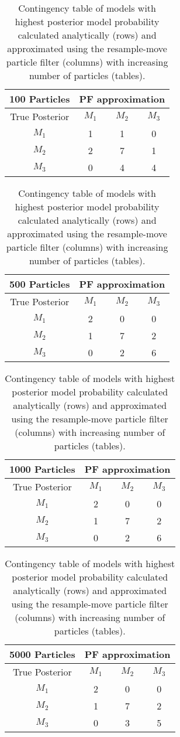 \documentclass{article}
\begin{document}
\begin{table}[h]
\centering
\caption{Contingency table of models with highest posterior model probability calculated analytically (rows) and approximated using the resample-move particle filter (columns) with increasing number of particles (tables).} \label{tab:cont}
\begin{tabular}{|c|c|c|c|}
  \hline
{\bf 100 Particles} & \multicolumn{3}{|c|}{PF approximation} \\
 \hline
 True Posterior & $M_1$& $M_2$ & $M_3$ \\
  \hline
$M_1$ &   1 &   1 &   0 \\
\hline
$M_2$ &   2 &   7 &   1 \\
\hline
$M_3$ &   0 &   4 &   4 \\
   \hline
\end{tabular}
\quad
\begin{tabular}{|c|c|c|c|}
  \hline
{\bf 500 Particles} & \multicolumn{3}{|c|}{PF approximation} \\
 \hline
 True Posterior & $M_1$& $M_2$ & $M_3$ \\
  \hline
$M_1$ &   2 &   0 &   0 \\
\hline
$M_2$ &   1 &   7 &   2 \\
\hline
$M_3$ &   0 &   2 &   6 \\
   \hline
\end{tabular}
\quad
\begin{tabular}{|c|c|c|c|}
  \hline
{\bf 1000 Particles} & \multicolumn{3}{|c|}{PF approximation} \\
 \hline
 True Posterior & $M_1$& $M_2$ & $M_3$ \\
  \hline
$M_1$ &   2 &   0 &   0 \\
\hline
  $M_2$ &   1 &   7 &   2 \\
  \hline
  $M_3$ &   0 &  2 &   6 \\
   \hline
\end{tabular}
\quad
\begin{tabular}{|c|c|c|c|}
  \hline
{\bf 5000 Particles} & \multicolumn{3}{|c|}{PF approximation} \\
 \hline
 True Posterior & $M_1$& $M_2$ & $M_3$ \\
  \hline
$M_1$ &   2 &   0 &   0 \\
  \hline
  $M_2$ &   1 &   7 &   2 \\
  \hline
  $M_3$ &   0 &   3 &   5 \\
   \hline
\end{tabular}
\end{table}
\end{document}
